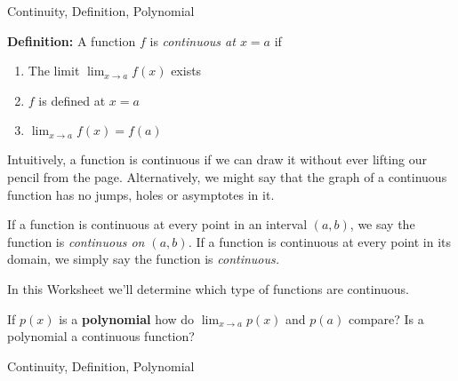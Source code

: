

\begin{tagblock}{Continuity, Definition, Polynomial}
\begin{question}
	
\textbf{Definition:}  A function $f$ is \emph{continuous at $x=a$} if 
\begin{enumerate}
\item The limit $\displaystyle \lim_{x \to a} f(x)$ exists
\item $f$ is defined at $x =a$
\item $\displaystyle \lim_{x \to a} f(x)=f(a)$
\end{enumerate}

 Intuitively, a function is continuous if we can draw it without ever lifting our pencil from the page. Alternatively, we might say that the graph of a continuous function has no jumps, holes or asymptotes in it. \\
 
 \bigskip
  
  If a function is continuous at every point in an interval $(a,b)$, we say the function is \emph{continuous on $(a,b)$.}  If a function is continuous at every point in its domain, we simply say the function is \emph{continuous.}

\bigskip

In this Worksheet we'll determine which type of functions are continuous. 
\bigskip

 

 If $p(x)$ is a \textbf{polynomial} how do $\displaystyle \lim_{x \to a} p(x)$ and  $p(a)$ compare?  Is a polynomial a continuous function?  
	
\begin{tags}
	   Continuity, Definition, Polynomial
\end{tags}
	
\begin{diary}
	  
\end{diary}


	

	\end{question}
	
	\end{tagblock}






